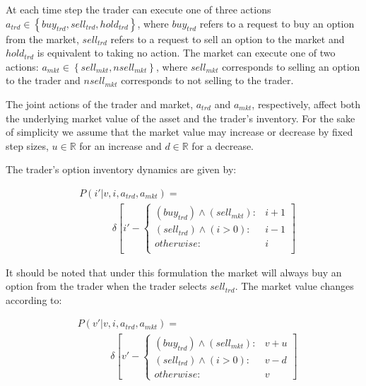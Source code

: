 At each time step the trader can execute one of three actions
$a_{trd} \in \left\{buy_{trd}, sell_{trd}, hold_{trd}\right\}$, where $buy_{trd}$ refers to a request to 
buy an option from the market, $sell_{trd}$ refers to a request to sell an option to
the market and $hold_{trd}$ is equivalent to taking no action. 
The market can execute one of two actions: $a_{mkt} \in \left\{sell_{mkt}, nsell_{mkt} \right\}$,
where $sell_{mkt}$ corresponds to selling an option to the trader and $nsell_{mkt}$ 
corresponds to not selling to the trader. 

The joint actions of the trader and market, $a_{trd}$ and 
$a_{mkt}$, respectively, affect both the underlying market value of the asset
and the trader's inventory. For the sake of simplicity we assume that
the market value may increase or decrease by fixed step sizes, 
$u \in \mathbb{R}$ for an increase and $d \in \mathbb{R}$ for a decrease.

The trader's option inventory dynamics are given by:

{\small 
\abovedisplayskip=0pt
\belowdisplayskip=0pt
\begin{align*}
& P(i' | v, i, a_{trd}, a_{mkt}) = \\
& \hspace{40pt} \delta \left[ i' - \begin{cases}
      (buy_{trd}) \wedge (sell_{mkt}) : & i + 1 \\ 
      (sell_{trd}) \wedge (i > 0) : & i - 1 \\
      otherwise: & i \\
    \end{cases} \right]
\end{align*}
}%

It should be noted that under this formulation the market will always
buy an option from the trader when the trader selects $sell_{trd}$. 
The market value changes according to:

{\small 
\abovedisplayskip=0pt
\belowdisplayskip=0pt
\begin{align*}
& P(v' | v, i, a_{trd}, a_{mkt}) = \\
& \hspace{40pt} \delta \left[ v' - \begin{cases}
      (buy_{trd}) \wedge (sell_{mkt})  : & v + u \\
       (sell_{trd}) \wedge (i > 0) : & v - d \\
      otherwise: & v
    \end{cases} \right]
\end{align*}
}%

